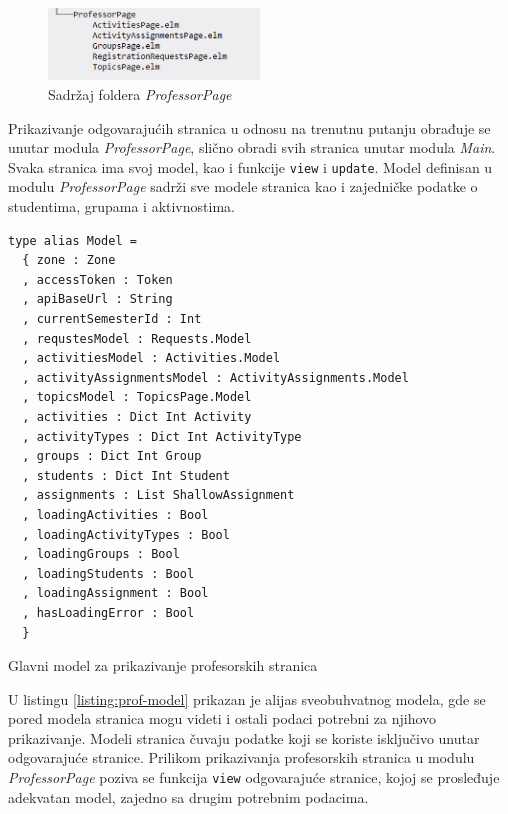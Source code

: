 \documentclass[12pt,oneside]{memoir}
\begin{document}
\begin{figure}[!ht]
  \centering
  \includegraphics[width=0.5\textwidth]{prof-page-dir.png}
  \caption{Sadržaj foldera \emph{ProfessorPage}}
  \label{fig:prof-dir}
\end{figure}

Prikazivanje odgovarajućih stranica u odnosu na trenutnu putanju obrađuje se unutar modula
\emph{ProfessorPage}, slično obradi svih stranica unutar modula \emph{Main}. 
Svaka stranica ima svoj model, kao i funkcije \texttt{view} i \texttt{update}.
Model definisan u modulu \emph{ProfessorPage} sadrži sve modele stranica
kao i zajedničke podatke o studentima, grupama i aktivnostima. 
\begin{listing}[h]
\begin{verbatim}
type alias Model =
  { zone : Zone
  , accessToken : Token
  , apiBaseUrl : String
  , currentSemesterId : Int
  , requstesModel : Requests.Model
  , activitiesModel : Activities.Model
  , activityAssignmentsModel : ActivityAssignments.Model
  , topicsModel : TopicsPage.Model
  , activities : Dict Int Activity
  , activityTypes : Dict Int ActivityType
  , groups : Dict Int Group
  , students : Dict Int Student
  , assignments : List ShallowAssignment
  , loadingActivities : Bool
  , loadingActivityTypes : Bool
  , loadingGroups : Bool
  , loadingStudents : Bool
  , loadingAssignment : Bool
  , hasLoadingError : Bool
  }
\end{verbatim}
\caption{Glavni model za prikazivanje profesorskih stranica}
\label{listing:prof-model}
\end{listing}
U listingu \ref{listing:prof-model} prikazan je alijas sveobuhvatnog modela, gde se pored
modela stranica mogu videti i ostali podaci potrebni za njihovo prikazivanje.
Modeli stranica čuvaju podatke koji se koriste isključivo unutar odgovarajuće stranice.
Prilikom prikazivanja profesorskih stranica u modulu \emph{ProfessorPage}
poziva se funkcija \texttt{view} odgovarajuće stranice, kojoj se prosleđuje adekvatan
model, zajedno sa drugim potrebnim podacima.
\end{document}
